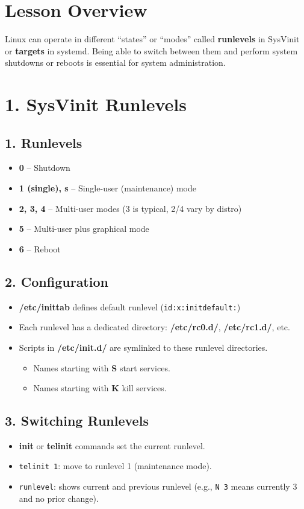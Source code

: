 \documentclass[12pt,a4paper]{report}
\begin{document}
\section*{Lesson Overview}

Linux can operate in different “states” or “modes” called \textbf{runlevels} in SysVinit or \textbf{targets} in systemd. Being able to switch between them and perform system shutdowns or reboots is essential for system administration.

\section*{1. SysVinit Runlevels}

\subsection*{1. Runlevels}
\begin{itemize}
    \item \textbf{0} – Shutdown
    \item \textbf{1 (single), s} – Single-user (maintenance) mode
    \item \textbf{2, 3, 4} – Multi-user modes (3 is typical, 2/4 vary by distro)
    \item \textbf{5} – Multi-user plus graphical mode
    \item \textbf{6} – Reboot
\end{itemize}

\subsection*{2. Configuration}
\begin{itemize}
    \item \textbf{/etc/inittab} defines default runlevel (\texttt{id:x:initdefault:})
    \item Each runlevel has a dedicated directory: \textbf{/etc/rc0.d/}, \textbf{/etc/rc1.d/}, etc.
    \item Scripts in \textbf{/etc/init.d/} are symlinked to these runlevel directories.
    \begin{itemize}
        \item Names starting with \textbf{S} start services.
        \item Names starting with \textbf{K} kill services.
    \end{itemize}
\end{itemize}

\subsection*{3. Switching Runlevels}
\begin{itemize}
    \item \textbf{init} or \textbf{telinit} commands set the current runlevel.
    \item \texttt{telinit 1}: move to runlevel 1 (maintenance mode).
    \item \texttt{runlevel}: shows current and previous runlevel (e.g., \texttt{N 3} means currently 3 and no prior change).
\end{itemize}
\end{document}
